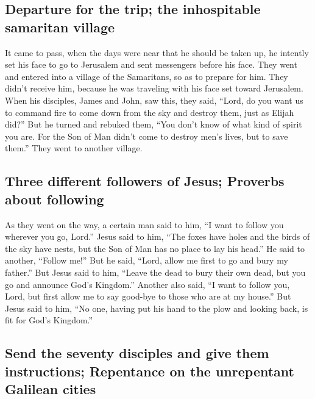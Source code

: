 \hypertarget{departure-for-the-trip-the-inhospitable-samaritan-village}{%
\subsection{Departure for the trip; the inhospitable samaritan
village}\label{departure-for-the-trip-the-inhospitable-samaritan-village}}

 It came to pass, when the days were near that he should
be taken up, he intently set his face to go to Jerusalem 
and sent messengers before his face. They went and entered into a
village of the Samaritans, so as to prepare for him. 
They didn't receive him, because he was traveling with his face set
toward Jerusalem.  When his disciples, James and John,
saw this, they said, ``Lord, do you want us to command fire to come down
from the sky and destroy them, just as Elijah did?''  But
he turned and rebuked them, ``You don't know of what kind of spirit you
are.  For the Son of Man didn't come to destroy men's
lives, but to save them.'' They went to another village.

\hypertarget{three-different-followers-of-jesus-proverbs-about-following}{%
\subsection{Three different followers of Jesus; Proverbs about
following}\label{three-different-followers-of-jesus-proverbs-about-following}}

 As they went on the way, a certain man said to him, ``I
want to follow you wherever you go, Lord.''  Jesus said
to him, ``The foxes have holes and the birds of the sky have nests, but
the Son of Man has no place to lay his head.''  He said
to another, ``Follow me!'' But he said, ``Lord, allow me first to go and
bury my father.''  But Jesus said to him, ``Leave the
dead to bury their own dead, but you go and announce God's Kingdom.''
 Another also said, ``I want to follow you, Lord, but
first allow me to say good-bye to those who are at my house.''
 But Jesus said to him, ``No one, having put his hand to
the plow and looking back, is fit for God's Kingdom.''

\hypertarget{send-the-seventy-disciples-and-give-them-instructions-repentance-on-the-unrepentant-galilean-cities}{%
\subsection{Send the seventy disciples and give them instructions;
Repentance on the unrepentant Galilean
cities}\label{send-the-seventy-disciples-and-give-them-instructions-repentance-on-the-unrepentant-galilean-cities}}

